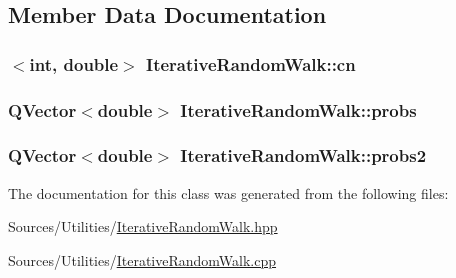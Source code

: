 \subsection{Member Data Documentation}
\hypertarget{class_iterative_random_walk_ab63a2f748e5f6a9753697259cbfa2c6f}{
\subsubsection[{cn}]{$<$int, double$>$ Iterative\+Random\+Walk\+::cn\hspace{0.3cm}{\ttfamily [private]}}}\label{class_iterative_random_walk_ab63a2f748e5f6a9753697259cbfa2c6f}
\hypertarget{class_iterative_random_walk_a843b2d9703e20d3f7ef7e13b3be53d17}{
\subsubsection[{probs}]{\setlength{\rightskip}{0pt plus 5cm}Q\+Vector$<$double$>$ Iterative\+Random\+Walk\+::probs\hspace{0.3cm}{\ttfamily [private]}}}\label{class_iterative_random_walk_a843b2d9703e20d3f7ef7e13b3be53d17}
\hypertarget{class_iterative_random_walk_a5db3cabf3a85df747c80b2c826d60ca7}{
\subsubsection[{probs2}]{\setlength{\rightskip}{0pt plus 5cm}Q\+Vector$<$double$>$ Iterative\+Random\+Walk\+::probs2\hspace{0.3cm}{\ttfamily [private]}}}\label{class_iterative_random_walk_a5db3cabf3a85df747c80b2c826d60ca7}


The documentation for this class was generated from the following files\+:\begin{DoxyCompactItemize}
\item 
Sources/\+Utilities/\hyperlink{_iterative_random_walk_8hpp}{Iterative\+Random\+Walk.\+hpp}\item 
Sources/\+Utilities/\hyperlink{_iterative_random_walk_8cpp}{Iterative\+Random\+Walk.\+cpp}\end{DoxyCompactItemize}
